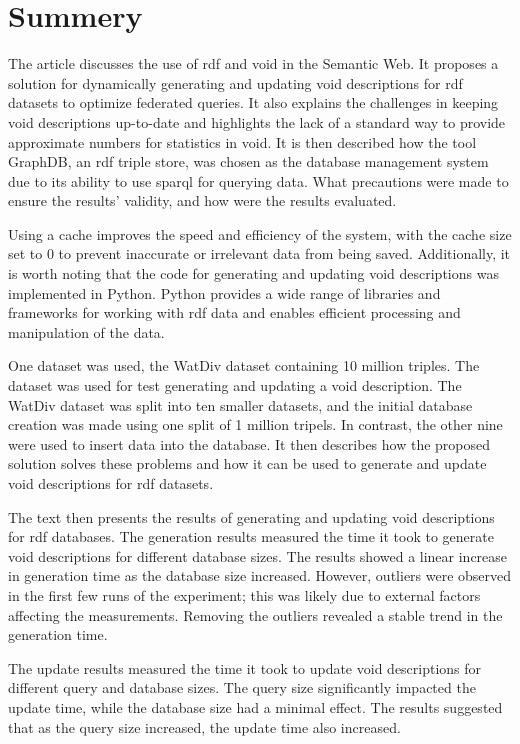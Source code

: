 \section{Summery}\label{sec:summery}
The article discusses the use of \gls{rdf} and \gls{void} in the Semantic Web. It proposes a solution for dynamically generating and updating \gls{void} descriptions for \gls{rdf} datasets to optimize federated queries. It also explains the challenges in keeping \gls{void} descriptions up-to-date and highlights the lack of a standard way to provide approximate numbers for statistics in \gls{void}. It is then described how the tool GraphDB, an \gls{rdf} triple store, was chosen as the database management system due to its ability to use \gls{sparql} for querying data. What precautions were made to ensure the results' validity, and how were the results evaluated.

Using a cache improves the speed and efficiency of the system, with the cache size set to 0 to prevent inaccurate or irrelevant data from being saved. Additionally, it is worth noting that the code for generating and updating \gls{void} descriptions was implemented in Python. Python provides a wide range of libraries and frameworks for working with \gls{rdf} data and enables efficient processing and manipulation of the data.

One dataset was used, the WatDiv dataset containing 10 million triples. The dataset was used for test generating and updating a \gls{void} description. The WatDiv dataset was split into ten smaller datasets, and the initial database creation was made using one split of 1 million tripels. In contrast, the other nine were used to insert data into the database. It then describes how the proposed solution solves these problems and how it can be used to generate and update \gls{void} descriptions for \gls{rdf} datasets.

The text then presents the results of generating and updating \gls{void} descriptions for \gls{rdf} databases. The generation results measured the time it took to generate \gls{void} descriptions for different database sizes. The results showed a linear increase in generation time as the database size increased. However, outliers were observed in the first few runs of the experiment; this was likely due to external factors affecting the measurements. Removing the outliers revealed a stable trend in the generation time.

The update results measured the time it took to update \gls{void} descriptions for different query and database sizes. The query size significantly impacted the update time, while the database size had a minimal effect. The results suggested that as the query size increased, the update time also increased.

